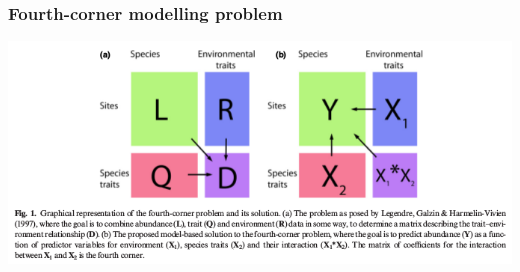 \documentclass{beamer}
\begin{document}
\begin{frame}
  \frametitle{Fourth-corner modelling problem}
  \begin{center}
    \includegraphics[height=0.8\textheight,width=\textwidth,keepaspectratio=true]{figure/brown_fourth_corner}
  \end{center}

\end{frame}
\end{document}
